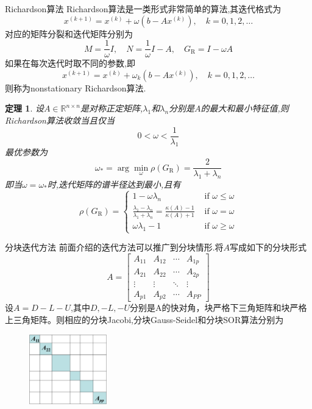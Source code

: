 \documentclass[notheorems,serif]{beamer}
\newcommand{\hei}[1]{{\HEI#1}}
\newtheorem{theorem}{\hei{定理}}
\begin{document}
\begin{frame}{Richardson算法}
Richardson算法是一类形式非常简单的算法,其迭代格式为
$$
x^{(k+1)}=x^{(k)}+\omega\left(b-A x^{(k)}\right), \quad k=0,1,2, \ldots
$$
对应的矩阵分裂和迭代矩阵分别为
$$
M=\frac{1}{\omega} I, \quad N=\frac{1}{\omega} I-A, \quad G_{\mathrm{R}}=I-\omega A
$$
如果在每次迭代时取不同的参数,即
$$
x^{(k+1)}=x^{(k)}+\omega_{k}\left(b-A x^{(k)}\right), \quad k=0,1,2, \ldots
$$
则称为nonstationary Richardson算法.
\end{frame}

\begin{theorem}
设$A \in \mathbb{R}^{n \times n}$是对称正定矩阵,$\lambda_1$和$\lambda_n$分别是$A$的最大和最小特征值,则Richardson算法收敛当且仅当
$$
0<\omega<\frac{1}{\lambda_{1}}
$$
最优参数为
$$
\omega_{*}=\arg \min _{\omega} \rho\left(G_{\mathrm{R}}\right)=\frac{2}{\lambda_{1}+\lambda_{n}}
$$
即当$\omega=\omega_{*}$时,迭代矩阵的谱半径达到最小,且有
$$
\rho\left(G_{\mathrm{R}}\right)=\left\{\begin{array}{ll}{1-\omega \lambda_{n}} & {\text { if } \omega \leq \omega} \\ {\frac{\lambda_{1}-\lambda_{n}}{\lambda_{1}+\lambda_{n}}=\frac{\kappa(A)-1}{\kappa(A)+1}} & {\text { if } \omega=\omega} \\ {\omega \lambda_{1}-1} & {\text { if } \omega \geq \omega}\end{array}\right.
$$
\end{theorem}

\begin{frame}
{分块迭代方法}
前面介绍的迭代方法可以推广到分块情形.将$A$写成如下的分块形式
$$
A=\left[\begin{array}{cccc}{A_{11}} & {A_{12}} & {\cdots} & {A_{1 p}} \\ {A_{21}} & {A_{22}} & {\cdots} & {A_{2 p}} \\ {\vdots} & {\vdots} & {\ddots} & {\vdots} \\ {A_{p 1}} & {A_{p 2}} & {\cdots} & {A_{P P}}\end{array}\right]
$$
设$A=D-L-U$,其中$D,-L,-U$分别是A的快对角，块严格下三角矩阵和块严格上三角矩阵。则相应的分块Jacobi,分块Gauss-Seidel和分块SOR算法分别为
\begin{figure}[h]
\includegraphics[width=0.3\textwidth]{figurest/figure_2.png} 
\end{figure}
\end{frame}
\end{document}
